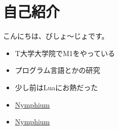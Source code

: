 \documentclass[unicode,compress,14pt,CJK%
\directlua{
    handout = os.getenv"HANDOUT"
    local _ = handout and tex.print(",handout")
},t]{beamer}
\begin{document}
\section{自己紹介}
\begin{frame}
    \frametitlesec

    \vfill

    \begin{minipage}[b]{.1\textwidth}
        \centering
    \end{minipage}
    \begin{minipage}[b]{.49\textwidth}
        こんにちは、びしょ〜じょです。
    \end{minipage}

    \begin{itemize}
        \item T大学大学院でM1をやっている
        \item プログラム言語とかの研究
        \item 少し前はLuaにお熱だった
    \end{itemize}

    \begin{itemize}
        \item[\textcolor{blue!60!white}{\faicon{twitter}}] \href{https://twitter.com/Nymphium}{Nymphium}
        \item[\textcolor{black}{\faicon{github}}] \href{https://github.com/nymphium}{Nymphium}
    \end{itemize}
    \vfill
\end{frame}
\end{document}

